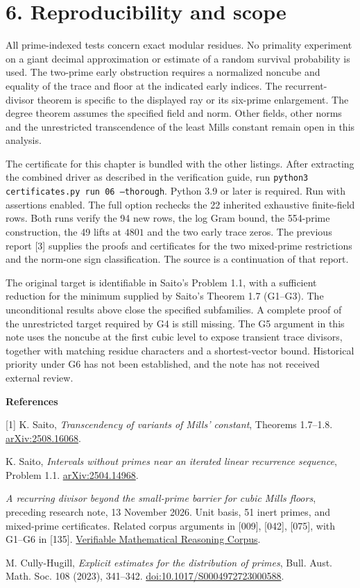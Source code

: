 \documentclass[11pt,a4paper,oneside,openany]{book}
\newcommand{\localhead}[1]{\needspace{5\baselineskip}\section*{\color{ink}#1}}
\let\sect\localhead\let\secx\localhead\let\head\localhead
\begin{document}
\sect{6. Reproducibility and scope}
All prime-indexed tests concern exact modular residues. No primality experiment on a giant decimal approximation or estimate of a random survival probability is used. The two-prime early obstruction requires a normalized noncube and equality of the trace and floor at the indicated early indices. The recurrent-divisor theorem is specific to the displayed ray or its six-prime enlargement. The degree theorem assumes the specified field and norm. Other fields, other norms and the unrestricted transcendence of the least Mills constant remain open in this analysis.

 The certificate for this chapter is bundled with the other listings. After extracting the combined driver as described in the verification guide, run \texttt{python3 certificates.py run 06 --thorough}.
Python 3.9 or later is required. Run with assertions enabled. The full option rechecks the 22 inherited exhaustive finite-field rows. Both runs verify the 94 new rows, the log Gram bound, the 554-prime construction, the 49 lifts at $4801$ and the two early trace zeros. The previous report [3] supplies the proofs and certificates for the two mixed-prime restrictions and the norm-one sign classification. The source is a continuation of that report.

 The original target is identifiable in Saito's Problem 1.1, with a sufficient reduction for the minimum supplied by Saito's Theorem 1.7 (G1--G3). The unconditional results above close the specified subfamilies. A complete proof of the unrestricted target required by G4 is still missing. The G5 argument in this note uses the noncube at the first cubic level to expose transient trace divisors, together with matching residue characters and a shortest-vector bound. Historical priority under G6 has not been established, and the note has not received external review.

\medskip\textbf{References}\par
{\small\raggedright
[1] K. Saito, \emph{Transcendency of variants of Mills' constant}, Theorems 1.7--1.8. \href{https://arxiv.org/abs/2508.16068}{arXiv:2508.16068}.\par
[2] K. Saito, \emph{Intervals without primes near an iterated linear recurrence sequence}, Problem 1.1. \href{https://arxiv.org/abs/2504.14968}{arXiv:2504.14968}.\par
[3] \emph{A recurring divisor beyond the small-prime barrier for cubic Mills floors}, preceding research note, 13 November 2026. Unit basis, 51 inert primes, and mixed-prime certificates. Related corpus arguments in [009], [042], [075], with G1--G6 in [135]. \href{https://github.com/QEEDDD/Verifiable-Mathematical-Reasoning-Corpus}{Verifiable Mathematical Reasoning Corpus}.\par
[4] M. Cully-Hugill, \emph{Explicit estimates for the distribution of primes}, Bull. Aust. Math. Soc. 108 (2023), 341--342. \href{https://doi.org/10.1017/S0004972723000588}{doi:10.1017/S0004972723000588}.\par}
\end{document}

